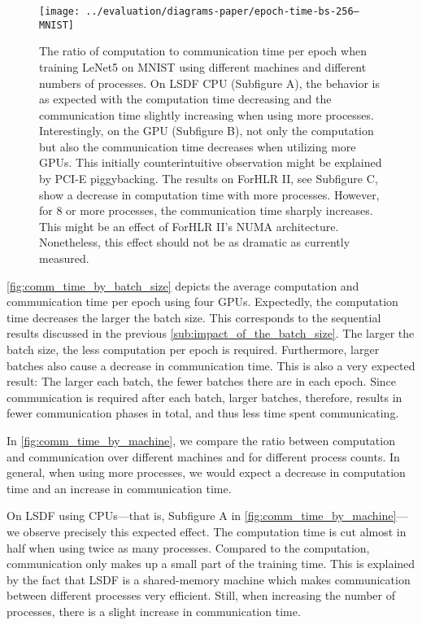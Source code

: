 \documentclass[conference]{IEEEtran}
\begin{document}
\begin{figure*}[!t]
  \normalsize
  \centering
  \texttt{[image: ../evaluation/diagrams-paper/epoch-time-bs-256--MNIST]}
  \caption{The ratio of computation to communication time per epoch when training LeNet5 on MNIST using different machines and different numbers of processes.
  On LSDF CPU (Subfigure A), the behavior is as expected with the computation time decreasing and the communication time slightly increasing when using more processes.
  Interestingly, on the GPU (Subfigure B), not only the computation but also the communication time decreases when utilizing more GPUs.
  This initially counterintuitive observation might be explained by PCI-E piggybacking.
  The results on ForHLR II, see Subfigure C, show a decrease in computation time with more processes.
  However, for 8 or more processes, the communication time sharply increases.
  This might be an effect of ForHLR II's NUMA architecture.
  Nonetheless, this effect should not be as dramatic as currently measured.
  }
  \label{fig:comm_time_by_machine}
  \vspace*{4pt}
  \hrulefill
\end{figure*}

\autoref{fig:comm_time_by_batch_size} depicts the average computation and communication time per epoch using four GPUs.
Expectedly, the computation time decreases the larger the batch size.
This corresponds to the sequential results discussed in the previous \autoref{sub:impact_of_the_batch_size}.
The larger the batch size, the less computation per epoch is required.
%
Furthermore, larger batches also cause a decrease in communication time.
This is also a very expected result:
The larger each batch, the fewer batches there are in each epoch.
Since communication is required after each batch, larger batches, therefore, results in fewer communication phases in total, and thus less time spent communicating.


In \autoref{fig:comm_time_by_machine}, we compare the ratio between computation and communication over different machines and for different process counts.
In general, when using more processes, we would expect a decrease in computation time and an increase in communication time.

On LSDF using CPUs---that is, Subfigure A in \autoref{fig:comm_time_by_machine}---we observe precisely this expected effect.
The computation time is cut almost in half when using twice as many processes.
Compared to the computation, communication only makes up a small part of the training time.
This is explained by the fact that LSDF is a shared-memory machine which makes communication between different processes very efficient.
Still, when increasing the number of processes, there is a slight increase in communication time.
\end{document}
